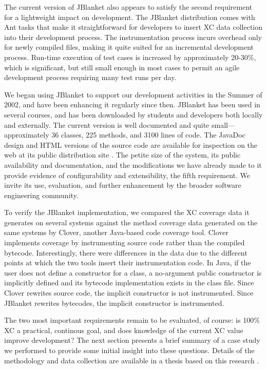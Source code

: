 \documentclass[10pt,twocolumn]{article}
\begin{document}
The current version of JBlanket also appears to satisfy the second
requirement for a lightweight impact on development. The JBlanket
distribution comes with Ant tasks that make it straightforward for
developers to insert XC data collection into their development process. The
instrumentation process incurs overhead only for newly compiled files,
making it quite suited for an incremental development process. Run-time
execution of test cases is increased by approximately 20-30\%, which is
significant, but still small enough in most cases to permit an agile development process
requiring many test runs per day.

We began using JBlanket to support our development activities in the Summer
of 2002, and have been enhancing it regularly since then. JBlanket has been
used in several courses, and has been downloaded by students and developers
both locally and externally.  The current version is well documented and
quite small---approximately 36 classes, 225 methods, and 3100 lines of
code. The JavaDoc design and HTML versions of the source code are available
for inspection on the web at its public distribution site \cite{JBlanket}.
The petite size of the system, its public availability and documentation,
and the modifications we have already made to it provide evidence of
configurability and extensibility, the fifth requirement. We invite its
use, evaluation, and further enhancement by the broader software engineering community.

To verify the JBlanket implementation, we compared the XC coverage data it
generates on several systems against the method coverage data generated on
the same systems by Clover, another Java-based code coverage tool. Clover
implements coverage by instrumenting source code rather than the compiled
bytecode.  Interestingly, there were differences in the data due to
the different points at which the two tools insert their instrumentation
code. In Java, if the user does not define a constructor for a class, a
no-argument public constructor is implicitly defined and its bytecode
implementation exists in the class file.  Since Clover rewrites source
code, the implicit constructor is not instrumented. Since JBlanket rewrites
bytecodes, the implicit constructor is instrumented.

The two most important requirements remain to be evaluated, of course: is
100\% XC a practical, continous goal, and does knowledge of the current XC value improve
development?  The next section presents a brief summary of a case study we
performed to provide some initial insight into these questions. Details of
the methodology and data collection are available in a thesis based on this research
\cite{csdl2-02-06}.
\end{document}
